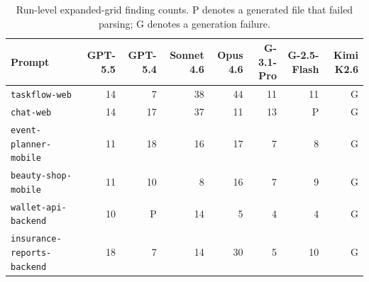 \begin{table}[ht]
  \centering
  \scriptsize
  \begingroup
  \setlength{\tabcolsep}{3pt}
  \begin{tabular}{lrrrrrrr}
    \toprule
    Prompt & GPT-5.5 & GPT-5.4 & Sonnet 4.6 & Opus 4.6 & G-3.1-Pro & G-2.5-Flash & Kimi K2.6 \\
    \midrule
    \texttt{taskflow-web} & 14 & 7 & 38 & 44 & 11 & 11 & G \\
    \texttt{chat-web} & 14 & 17 & 37 & 11 & 13 & P & G \\
    \texttt{event-planner-mobile} & 11 & 18 & 16 & 17 & 7 & 8 & G \\
    \texttt{beauty-shop-mobile} & 11 & 10 & 8 & 16 & 7 & 9 & G \\
    \texttt{wallet-api-backend} & 10 & P & 14 & 5 & 4 & 4 & G \\
    \texttt{insurance-reports-backend} & 18 & 7 & 14 & 30 & 5 & 10 & G \\
    \bottomrule
  \end{tabular}
  \endgroup
  \caption{Run-level expanded-grid finding counts. P denotes a generated file that failed parsing; G denotes a generation failure.}
  \label{tab:expanded-grid-matrix}
\end{table}

